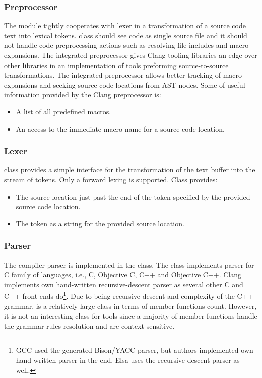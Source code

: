 \subsubsection{Preprocessor}
The  module tightly cooperates with lexer in a transformation of a source code text into lexical tokens.  class should see code as single source file and it should not handle code preprocessing actions such as resolving file includes and macro expansions. The integrated preprocessor gives Clang tooling libraries an edge over other libraries in an implementation of tools preforming source-to-source transformations. The integrated preprocessor allows better tracking of macro expansions and seeking source code locations from AST nodes. Some of useful information provided by the Clang preprocessor is:

\begin{itemize}
\item A list of all predefined macros.
\item An access to the immediate macro name for a source code location.
\end{itemize}

\subsubsection{Lexer}
 class provides a simple interface for the transformation of the text buffer into the stream of tokens. Only a forward lexing is supported. Class provides:

\begin{itemize}
\item The source location just past the end of the token specified by the provided source code location.
\item The token as a string for the provided source location.
\end{itemize}

\subsubsection{Parser}
The compiler parser is implemented in the  class. The class implements parser for C family of languages, i.e., C, Objective C, C++ and Objective C++. Clang implements own hand-written recursive-descent parser as several other C and C++ front-ends do\footnote{GCC used the generated Bison/YACC parser, but authors implemented own hand-written parser in the end. Elsa uses the recursive-descent parser as well.}. Due to being recursive-descent and complexity of the C++ grammar,  is a relatively large class in terms of member functions count. However, it is not an interesting class for tools since a majority of member functions handle the grammar rules resolution and are context sensitive.

